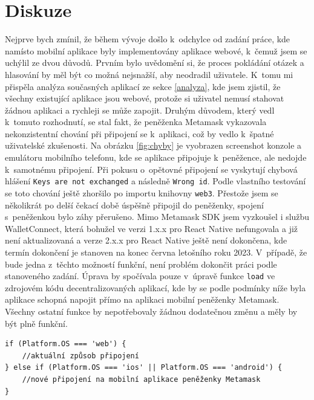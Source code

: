 \section{Diskuze}
Nejprve bych zmínil, že během vývoje došlo k~odchylce od zadání práce, kde namísto mobilní aplikace byly implementovány aplikace webové, k~čemuž jsem se uchýlil ze dvou důvodů. Prvním bylo uvědomění si, že proces pokládání otázek a hlasování by měl být co možná nejsnažší, aby neodradil uživatele. K~tomu mi přispěla analýza současných aplikací ze sekce \ref{analyza}, kde jsem zjistil, že všechny existující aplikace jsou webové, protože si uživatel nemusí stahovat žádnou aplikaci a rychleji se může zapojit. Druhým důvodem, který vedl k~tomuto rozhodnutí, se stal fakt, že peněženka Metamask vykazovala nekonzistentní chování při připojení se k~aplikaci, což by vedlo k~špatné uživatelské zkušenosti. Na obrázku \ref{fig:chyby} je vyobrazen screenshot konzole a emulátoru mobilního telefonu, kde se aplikace připojuje k~peněžence, ale nedojde k~samotnému připojení. Při pokusu o~opětovné připojení se vyskytují chybová hlášení \texttt{Keys are not exchanged} a následně \texttt{Wrong id}. Podle vlastního testování se toto chování ještě zhoršilo po importu knihovny \texttt{web3}. Přestože jsem se několikrát po delší čekací době úspěšně připojil do peněženky, spojení s~peněženkou bylo záhy přerušeno. Mimo Metamask SDK jsem vyzkoušel i službu WalletConnect, která bohužel ve verzi 1.x.x pro React Native nefungovala a již není aktualizovaná a verze 2.x.x pro React Native ještě není dokončena, kde termín dokončení je stanoven na konec června letošního roku 2023. V~případě, že bude jedna z~těchto možností funkční, není problém dokončit práci podle stanoveného zadání. Úprava by spočívala pouze v~úpravě funkce \texttt{load} ve zdrojovém kódu decentralizovaných aplikací, kde by se podle podmínky níže byla aplikace schopná napojit přímo na aplikaci mobilní peněženky Metamask. Všechny ostatní funkce by nepotřebovaly žádnou dodatečnou změnu a měly by být plně funkční.
\begin{verbatim}
if (Platform.OS === 'web') {
    //aktuální způsob připojení
} else if (Platform.OS === 'ios' || Platform.OS === 'android') {
    //nové připojení na mobilní aplikace peněženky Metamask
}
\end{verbatim}

